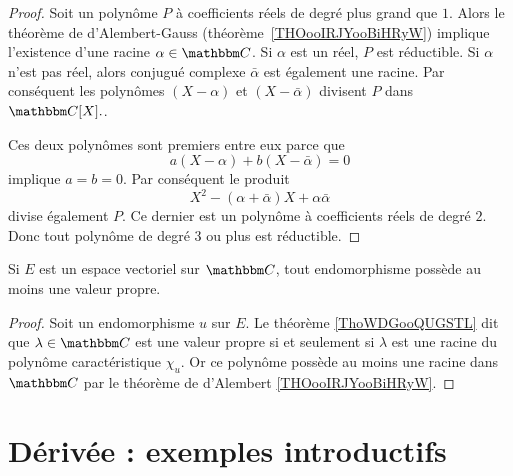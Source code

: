 \begin{proof}
    Soit un polynôme \( P\) à coefficients réels de degré plus grand que \( 1\). Alors le théorème de d'Alembert-Gauss (théorème~\ref{THOooIRJYooBiHRyW}) implique l'existence d'une racine \( \alpha \in \eC \). Si $\alpha$ est un réel, $P$ est réductible. Si \( \alpha\) n'est pas réel, alors conjugué complexe \( \bar \alpha\) est également une racine. Par conséquent les polynômes \( (X-\alpha)\) et \( (X-\bar \alpha)\) divisent \( P\) dans \( \eC[X]. \).

    Ces deux polynômes sont premiers entre eux parce que
    \begin{equation}
        a(X-\alpha)+b(X-\bar \alpha)=0
    \end{equation}
    implique \( a=b=0\). Par conséquent le produit
    \begin{equation}
        X^2-(\alpha+\bar \alpha)X+\alpha\bar\alpha
    \end{equation}
    divise également \( P\). Ce dernier est un polynôme à coefficients réels de degré \( 2\). Donc tout polynôme de degré \( 3\) ou plus est réductible.
\end{proof}

\begin{proposition}     \label{PROPooLXGSooXmVcVG}
    Si \( E\) est un espace vectoriel sur \( \eC\), tout endomorphisme possède au moins une valeur propre.
\end{proposition}

\begin{proof}
    Soit un endomorphisme \( u\) sur \( E\). Le théorème \ref{ThoWDGooQUGSTL} dit que \( \lambda\in \eC\) est une valeur propre si et seulement si \( \lambda\) est une racine du polynôme caractéristique \( \chi_u\). Or ce polynôme possède au moins une racine dans \( \eC\) par le théorème de d'Alembert \ref{THOooIRJYooBiHRyW}.
\end{proof}

\section{Dérivée : exemples introductifs}

